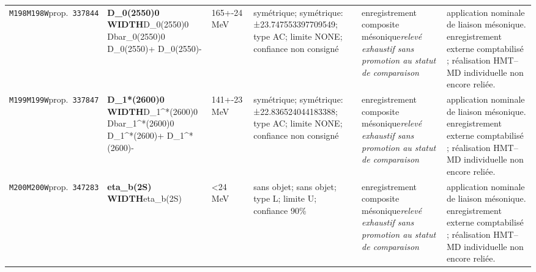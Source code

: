 \begin{landscape}
\begin{longtable}{L{1.85cm}L{4.45cm}L{2.35cm}L{4.05cm}L{3.35cm}L{7.15cm}}
\texttt{M198}\newline \texttt{M198W}\newline prop.\ \texttt{337844} & \textbf{D\_\allowbreak{}0(2550)0 WIDTH}\newline D\_\allowbreak{}0(2550)0 \textbar{}\allowbreak{} Dbar\_\allowbreak{}0(2550)0 \textbar{}\allowbreak{} D\_\allowbreak{}0(2550)+ \textbar{}\allowbreak{} D\_\allowbreak{}0(2550)- & 165+-24\,MeV & symétrique; symétrique: ±23.747553397709549; type AC; limite NONE; confiance non consigné & enregistrement composite mésonique\newline \emph{relevé exhaustif sans promotion au statut de comparaison} & application nominale de liaison mésonique. enregistrement externe comptabilisé ; réalisation HMT--MD individuelle non encore reliée. \\
\texttt{M199}\newline \texttt{M199W}\newline prop.\ \texttt{337847} & \textbf{D\_\allowbreak{}1*(2600)0 WIDTH}\newline D\_\allowbreak{}1\textasciicircum{}*(2600)0 \textbar{}\allowbreak{} Dbar\_\allowbreak{}1\textasciicircum{}*(2600)0 \textbar{}\allowbreak{} D\_\allowbreak{}1\textasciicircum{}*(2600)+ \textbar{}\allowbreak{} D\_\allowbreak{}1\textasciicircum{}*(2600)- & 141+-23\,MeV & symétrique; symétrique: ±22.836524044183388; type AC; limite NONE; confiance non consigné & enregistrement composite mésonique\newline \emph{relevé exhaustif sans promotion au statut de comparaison} & application nominale de liaison mésonique. enregistrement externe comptabilisé ; réalisation HMT--MD individuelle non encore reliée. \\
\texttt{M200}\newline \texttt{M200W}\newline prop.\ \texttt{347283} & \textbf{eta\_\allowbreak{}b(2S) WIDTH}\newline eta\_\allowbreak{}b(2S) & \textless{}24\,MeV & sans objet; sans objet; type L; limite U; confiance 90\% & enregistrement composite mésonique\newline \emph{relevé exhaustif sans promotion au statut de comparaison} & application nominale de liaison mésonique. enregistrement externe comptabilisé ; réalisation HMT--MD individuelle non encore reliée. \\

\end{longtable}
\end{landscape}

